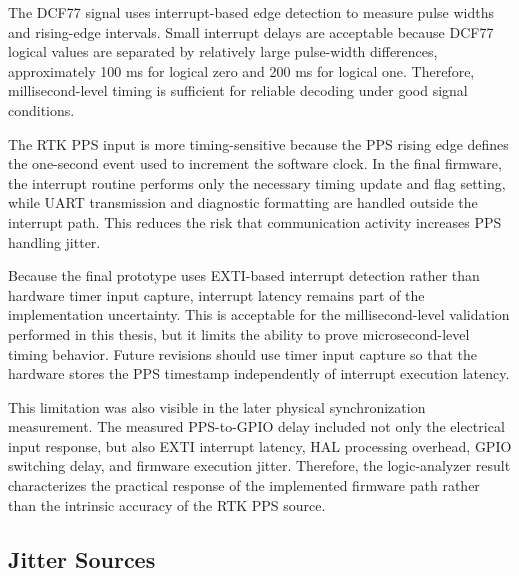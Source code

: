 The DCF77 signal uses interrupt-based edge detection to measure pulse widths and rising-edge intervals. Small interrupt delays are acceptable because DCF77 logical values are separated by relatively large pulse-width differences, approximately 100 ms for logical zero and 200 ms for logical one. Therefore, millisecond-level timing is sufficient for reliable decoding under good signal conditions.

The RTK PPS input is more timing-sensitive because the PPS rising edge defines the one-second event used to increment the software clock. In the final firmware, the interrupt routine performs only the necessary timing update and flag setting, while UART transmission and diagnostic formatting are handled outside the interrupt path. This reduces the risk that communication activity increases PPS handling jitter.

Because the final prototype uses EXTI-based interrupt detection rather than hardware timer input capture, interrupt latency remains part of the implementation uncertainty. This is acceptable for the millisecond-level validation performed in this thesis, but it limits the ability to prove microsecond-level timing behavior. Future revisions should use timer input capture so that the hardware stores the PPS timestamp independently of interrupt execution latency.

This limitation was also visible in the later physical synchronization measurement. The measured PPS-to-GPIO delay included not only the electrical input response, but also EXTI interrupt latency, HAL processing overhead, GPIO switching delay, and firmware execution jitter. Therefore, the logic-analyzer result characterizes the practical response of the implemented firmware path rather than the intrinsic accuracy of the RTK PPS source.

\subsection{Jitter Sources}

